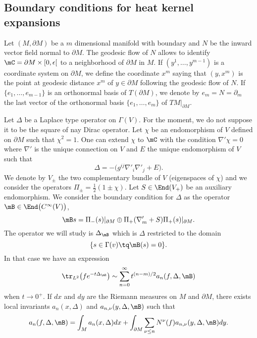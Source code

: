 \subsection{Boundary conditions for heat kernel expansions}


Let $(M,\partial M)$ be a $m$ dimensional manifold with boundary and $N$ be the inward vector field normal to $\partial M$. The geodesic flow of $N$ allows to identify $\mC=\partial M\times [0,\epsilon[$ to a neighborhood of $\partial M$ in $M$. If $(y^1,\ldots,y^{m-1})$ is a coordinate system on $\partial M$, we define the coordinate $x^m$ saying that $(y,x^m)$ is the point at geodesic distance $x^m$ of $y\in \partial M$ following the geodesic flow of $N$. If $\{ e_1,\ldots,e_{m-1} \}$ is an orthonormal basis of $T(\partial M)$, we denote by $e_m=N=\partial_m$ the last vector of the orthonormal basis $\{ e_1,\ldots,e_m \}$ of $TM|_{\partial M}$.

Let $\Delta$ be a Laplace type operator on $\Gamma(V)$. For the moment, we do not suppose it to be the square of nay Dirac operator. Let $\chi$ be an endomorphism of $V$ defined on $\partial M$ such that $\chi^2=1$. One can extend $\chi$ to $\mC$ with the condition $\nabla'\chi=0$ where $\nabla'$ is the unique connection on $V$ and $E$ the unique endomorphism of $V$ such that
\[ 
  \Delta=-\big( g^{ij}\nabla'_i\nabla'_j+E \big).
\]
We denote by $V_{\pm}$ the two complementary bundle of $V$ (eigenspaces of $\chi$) and we consider the operators $\Pi_{\pm}=\frac{ 1 }{2}(1\pm\chi)$. Let $S\in\End(V_+)$ be an auxiliary endomorphism. We consider the boundary condition for $\Delta$ as the operator $\mB\in\End\big(  C^{\infty}(V) \big)$,
\begin{equation}
\mB s=\Pi_-(s)|_{\partial M}\oplus \Pi_+(\nabla'_m+S)\Pi_+(s)|_{\partial M}.
\end{equation}
The operator we will study is $\Delta_{\mB}$ which is $\Delta$ restricted to the domain
\[ 
  \{ s\in\Gamma(v)\tq \mB(s)=0 \}.
\]
In that case we have an expression
\begin{equation}
\tr_{L^2}\big( f e^{-t\Delta_{\mB}} \big)\sim\sum_{n=0}^{\infty}t^{(n-m)/2}a_n(f,\Delta,\mB)
\end{equation}
when $t\to 0^+$. If $dx$ and $dy$ are the Riemann measures on $M$ and $\partial M$, there exists local invariants $a_n(x,\Delta)$ and $a_{n,\nu}(y,\Delta,\mB)$ such that
\begin{equation}
a_n(f,\Delta,\mB)=\int_Ma_n(x,\Delta)dx+\int_{\partial M}\sum_{\nu\leq n}N^{\nu}(f)a_{n,\nu}(y,\Delta,\mB)dy.
\end{equation}

